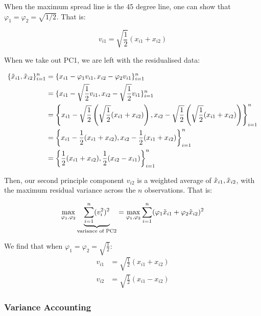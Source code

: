 \documentclass[11pt]{article}
\begin{document}
\begin{example}
    When the maximum spread line is the 45 degree line, one can show that $\varphi_1 = \varphi_2 = \sqrt{1/2}$. That is:

    \begin{equation*}
        v_{i1} = \sqrt{\dfrac{1}{2}}(x_{i1} + x_{i2})
    \end{equation*}

    When we take out PC1, we are left with the residualised data:

    \begin{align*}
        \{\Tilde{x}_{i1}, \Tilde{x}_{i2}\}_{i=1}^n &= \{x_{i1} - \varphi_1 v_{i1},x_{i2} - \varphi_2 v_{i1}\}_{i=1}^n \\
        &= \{x_{i1} - \sqrt{\frac{1}{2}} v_{i1},x_{i2} - \sqrt{\frac{1}{2}} v_{i1}\}_{i=1}^n \\
        &= \left\{x_{i1} - \sqrt{\frac{1}{2}} \left(\sqrt{\frac{1}{2}}(x_{i1} + x_{i2})\right),x_{i2} - \sqrt{\frac{1}{2}} \left(\sqrt{\frac{1}{2}}(x_{i1}+x_{i2})\right)\right\}_{i=1}^n \\
         &= \left\{x_{i1} - \frac{1}{2}(x_{i1} + x_{i2}),x_{i2} - \frac{1}{2}(x_{i1}+x_{i2})\right\}_{i=1}^n \\
         &= \left\{\frac{1}{2}(x_{i1} + x_{i2}),\frac{1}{2}(x_{i2}-x_{i1})\right\}_{i=1}^n
    \end{align*}

    Then, our second principle component $v_{i2}$ is a weighted average of $\Tilde{x}_{i1}, \Tilde{x}_{i2}$, with the maximum residual variance across the $n$ observations. That is:

    \begin{equation}
        \underset{\varphi_1, \varphi_2}{\max}\underbrace{\sum_{i=1}^n (v_i^2)^2}_{\text{variance of PC2}} = \underset{\varphi_1, \varphi_2}{\max} \sum_{i=1}^n (\varphi_1 \Tilde{x}_{i1} + \varphi_2 \Tilde{x}_{i2})^2
    \end{equation}

    We find that when $\varphi_1 = \varphi_2 = \sqrt{\frac{1}{2}}$:
    \begin{align*}
    v_{i1} &= \sqrt{\frac{1}{2}}(x_{i1} + x_{i2}) \\
    v_{i2} &= \sqrt{\frac{1}{2}}(x_{i1} - x_{i2})
    \end{align*}
\end{example}

\subsubsection{Variance Accounting}
\end{document}
